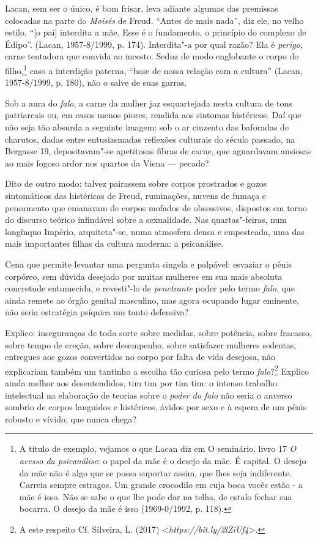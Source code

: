 Lacan, sem ser o único, é bom frisar, leva adiante algumas das premissas
colocadas na parte  do \emph{Moisés} de Freud. ``Antes de mais
nada'', diz ele, no velho estilo, ``{[}o pai{]} interdita a mãe. Esse é
o fundamento, o princípio do complexo de Édipo''. (Lacan, 1957-8/1999,
p. 174). Interdita"-a por qual razão? Ela é \emph{perigo}, carne
tentadora que convida ao incesto. Seduz de modo englobante o corpo do
filho,\footnote{A título de exemplo, vejamos o que Lacan diz em O
  seminário, livro 17 \emph{O avesso da psicanálise}: o papel da mãe é o
  desejo da mãe. É capital. O desejo da mãe não é algo que se possa
  suportar assim, que lhes seja indiferente. Carreia sempre estragos. Um
  grande crocodilo em cuja boca vocês estão - a mãe é isso. Não se sabe
  o que lhe pode dar na telha, de estalo fechar sua bocarra. O desejo da
  mãe é isso (1969-0/1992, p. 118).} caso a interdição paterna, ``base
de nossa relação com a cultura'' (Lacan, 1957-8/1999, p. 180), não o
salve de suas garras.

Sob a aura do \emph{falo}, a carne da mulher jaz esquartejada nesta
cultura de tons patriarcais ou, em casos menos piores, rendida aos
sintomas histéricos. Daí que não seja tão absurda a seguinte imagem: sob
o ar cinzento das baforadas de charutos, dadas entre entusiasmadas
reflexões culturais do século passado, na Bergasse 19, depositavam"-se
apetitosas fibras de carne, que aguardavam ansiosas ao mais fogoso ardor
nos quartos da Viena --- pecado?

Dito de outro modo: talvez pairassem sobre corpos prostrados e gozos
sintomáticos das histéricas de Freud, ruminações, nuvens de fumaça e
pensamento que emanavam de corpos mofados de obsessivos, dispostos em
torno do discurso teórico infindável sobre a sexualidade. Nas
quartas"-feiras, num longínquo Império, arquiteta"-se, numa atmosfera
densa e empesteada, uma das mais importantes filhas da cultura moderna:
a psicanálise.

Cena que permite levantar uma pergunta singela e palpável: esvaziar o
pênis corpóreo, sem dúvida desejado por muitas mulheres em sua mais
absoluta concretude entumecida, e revesti"-lo de \emph{penetrante} poder
pelo termo \emph{falo}, que ainda remete ao órgão genital masculino, mas
agora ocupando lugar eminente, não seria estratégia psíquica um tanto
defensiva?

Explico: inseguranças de toda sorte sobre medidas, sobre potência, sobre
fracasso, sobre tempo de ereção, sobre desempenho, sobre satisfazer
mulheres sedentas, entregues aos gozos convertidos no corpo por falta de
vida desejosa, não explicariam também um tantinho a escolha tão curiosa
pelo termo \emph{falo}?\footnote{A este respeito Cf. Silveira, L. (2017)
  \textless{}\emph{https://bit.ly/2lZiUf4}\textgreater{}.}
Explico ainda melhor aos desentendidos, tim tim por tim tim: o intenso
trabalho intelectual na elaboração de teorias sobre o \emph{poder do
falo} não seria o anverso sombrio de corpos languidos e histéricos,
ávidos por sexo e à espera de um pênis robusto e vívido, que nunca
chega?

